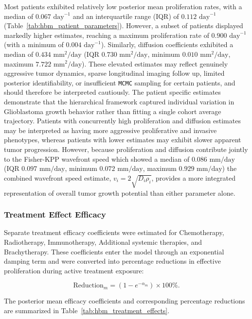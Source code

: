 Most patients exhibited relatively low posterior mean proliferation rates, with a median of $0.067\text{ day}^{-1}$ and an interquartile range (IQR) of $0.112\text{ day}^{-1}$ (Table~\ref{tab:hbm_patient_parameters}). However, a subset of patients displayed markedly higher estimates, reaching a maximum proliferation rate of $0.900\text{ day}^{-1}$ (with a minimum of $0.004\text{ day}^{-1}$). Similarly, diffusion coefficients exhibited a median of $0.434\text{ mm}^2/\text{day}$ (IQR $0.730\text{ mm}^2/\text{day}$, minimum $0.010\text{ mm}^2/\text{day}$, maximum $7.722\text{ mm}^2/\text{day}$). These elevated estimates may reflect genuinely aggressive tumor dynamics, sparse longitudinal imaging follow up, limited posterior identifiability, or insufficient \texttt{MCMC} sampling for certain patients, and should therefore be interpreted cautiously. The patient specific estimates demonstrate that the hierarchical framework captured individual variation in Glioblastoma growth behavior rather than fitting a single cohort average trajectory. Patients with concurrently high proliferation and diffusion estimates may be interpreted as having more aggressive proliferative and invasive phenotypes, whereas patients with lower estimates may exhibit slower apparent tumor progression. However, because proliferation and diffusion contribute jointly to the Fisher-KPP wavefront speed which showed a median of $0.086\text{ mm/day}$ (IQR $0.097\text{ mm/day}$, minimum $0.072\text{ mm/day}$, maximum $0.929\text{ mm/day}$) the combined wavefront speed estimate, $v_i = 2\sqrt{D_i\rho_i}$, provides a more integrated representation of overall tumor growth potential than either parameter alone.

\subsubsection{Treatment Effect Efficacy}

Separate treatment efficacy coefficients were estimated for Chemotherapy, Radiotherapy, Immunotherapy, Additional systemic therapies, and Brachytherapy. These coefficients enter the model through an exponential damping term and were converted into percentage reductions in effective proliferation during active treatment exposure:

\begin{equation}
\text{Reduction}_m =
\left(1 - e^{-\alpha_m}\right) \times 100\%.
\end{equation}

The posterior mean efficacy coefficients and corresponding percentage reductions are summarized in Table~\ref{tab:hbm_treatment_effects}.


